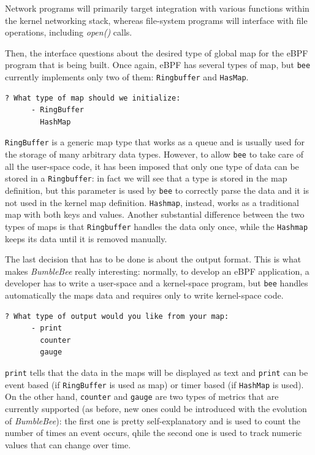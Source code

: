 Network programs will primarily target integration with various functions within the kernel networking stack, whereas file-system programs will interface with file operations, including \textit{open()} calls.

Then, the interface questions about the desired type of global map for the eBPF program that is being built.
Once again, eBPF has several types of map, but \verb|bee| currently implements only two of them: \verb|Ringbuffer| and \verb|HasMap|.

\begin{lstlisting}[language=bash, caption={bee map type selection}]
	? What type of map should we initialize: 
	  - RingBuffer
	    HashMap
\end{lstlisting}

\verb|RingBuffer| is a generic map type that works as a queue and is usually used for the storage of many arbitrary data types.
However, to allow \verb|bee| to take care of all the user-space code, it has been imposed that only one type of data can be stored in a \verb|Ringbuffer|: in fact we will see that a type is stored in the map definition, but this parameter is used by \verb|bee| to correctly parse the data and it is not used in the kernel map definition. 
\verb|Hashmap|, instead, works as a traditional map with both keys and values.
Another substantial difference between the two types of maps is that \verb|Ringbuffer| handles the data only once, while the \verb|Hashmap| keeps its data until it is removed manually.

The last decision that has to be done is about the output format.
This is what makes \textit{BumbleBee} really interesting: normally, to develop an eBPF application, a developer has to write a user-space and a kernel-space program, but \verb|bee| handles automatically the maps data and requires only to write kernel-space code.

\begin{lstlisting}[language=bash, caption={bee output format selection}]
	? What type of output would you like from your map: 
	  - print
	    counter
	    gauge
\end{lstlisting}

\verb|print| tells that the data in the maps will be displayed as text and \verb|print| can be event based (if \verb|RingBuffer| is used as map) or timer based (if \verb|HashMap| is used).
On the other hand, \verb|counter| and \verb|gauge| are two types of metrics that are currently supported (as before, new ones could be introduced with the evolution of \textit{BumbleBee}): the first one is pretty self-explanatory and is used to count the number of times an event occurs, qhile the second one is used to track numeric values that can change over time.

